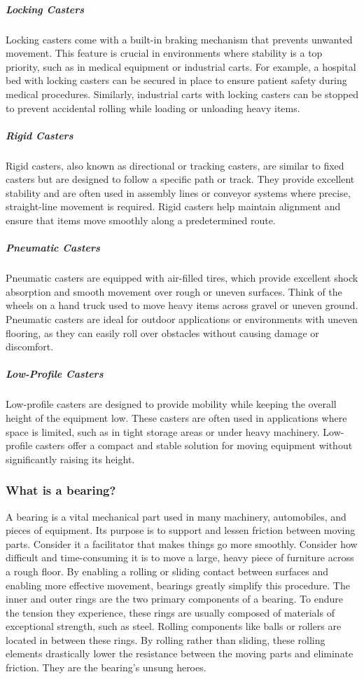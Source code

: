 \documentclass[../../main]{subfiles}
\begin{document}
\subparagraph{Locking Casters}
Locking casters come with a built-in braking mechanism that prevents unwanted movement. This feature is crucial in environments where stability is a top priority, such as in medical equipment or industrial carts. For example, a hospital bed with locking casters can be secured in place to ensure patient safety during medical procedures. Similarly, industrial carts with locking casters can be stopped to prevent accidental rolling while loading or unloading heavy items.

\subparagraph{Rigid Casters}
Rigid casters, also known as directional or tracking casters, are similar to fixed casters but are designed to follow a specific path or track. They provide excellent stability and are often used in assembly lines or conveyor systems where precise, straight-line movement is required. Rigid casters help maintain alignment and ensure that items move smoothly along a predetermined route.

\subparagraph{Pneumatic Casters}
Pneumatic casters are equipped with air-filled tires, which provide excellent shock absorption and smooth movement over rough or uneven surfaces. Think of the wheels on a hand truck used to move heavy items across gravel or uneven ground. Pneumatic casters are ideal for outdoor applications or environments with uneven flooring, as they can easily roll over obstacles without causing damage or discomfort.

\subparagraph{Low-Profile Casters}
Low-profile casters are designed to provide mobility while keeping the overall height of the equipment low. These casters are often used in applications where space is limited, such as in tight storage areas or under heavy machinery. Low-profile casters offer a compact and stable solution for moving equipment without significantly raising its height.

\subsubsection{What is a bearing?}
A bearing is a vital mechanical part used in many machinery, automobiles, and pieces of equipment. Its purpose is to support and lessen friction between moving parts. Consider it a facilitator that makes things go more smoothly. Consider how difficult and time-consuming it is to move a large, heavy piece of furniture across a rough floor. By enabling a rolling or sliding contact between surfaces and enabling more effective movement, bearings greatly simplify this procedure.
The inner and outer rings are the two primary components of a bearing. To endure the tension they experience, these rings are usually composed of materials of exceptional strength, such as steel. Rolling components like balls or rollers are located in between these rings. By rolling rather than sliding, these rolling elements drastically lower the resistance between the moving parts and eliminate friction. They are the bearing's unsung heroes.
\end{document}
